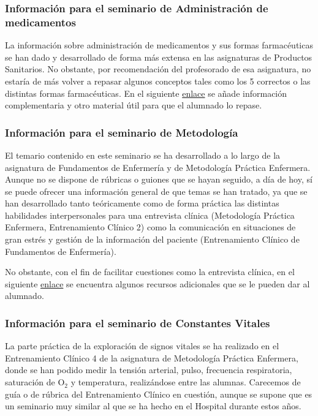 \subsubsection{Información para el seminario de Administración de medicamentos}
La información sobre administración de medicamentos y sus formas farmacéuticas se han dado y desarrollado de forma más extensa en las asignaturas de Productos Sanitarios. No obstante, por recomendación del profesorado de esa asignatura, no estaría de más volver a repasar algunos conceptos tales como los 5 correctos o las distintas formas farmacéuticas. En el siguiente \href{https://drive.google.com/file/d/1HTP2GfZeWYLZwk92cyGrsME6C4fFszZN/view?usp=sharing}{enlace} se añade información complementaria y otro material útil para que el alumnado lo repase.
\subsubsection{Información para el seminario de Metodología}
El temario contenido en este seminario se ha desarrollado a lo largo de la asignatura de Fundamentos de Enfermería y de Metodología Práctica Enfermera. Aunque no se dispone de rúbricas o guiones que se hayan seguido, a día de hoy, sí se puede ofrecer una información general de que temas se han tratado, ya que se han desarrollado tanto teóricamente como de forma práctica las distintas habilidades interpersonales para una entrevista clínica (Metodología Práctica Enfermera, Entrenamiento Clínico 2) como la comunicación en situaciones de gran estrés y gestión de la información del paciente (Entrenamiento Clínico de Fundamentos de Enfermería).

No obstante, con el fin de facilitar cuestiones como la entrevista clínica, en el siguiente \href{https://drive.google.com/file/d/1kEbxhZpLn3UWbtczPN1\_ucrZYSzvwk7P/view?usp=sharing}{enlace} se encuentra algunos recursos adicionales que se le pueden dar al alumnado.
\subsubsection{Información para el seminario de Constantes Vitales}
La parte práctica de la exploración de signos vitales se ha realizado en el Entrenamiento Clínico 4 de la asignatura de Metodología Práctica Enfermera, donde se han podido medir la tensión arterial, pulso, frecuencia respiratoria, saturación de O$_2$ y temperatura, realizándose entre las alumnas. Carecemos de guía o de rúbrica del Entrenamiento Clínico en cuestión, aunque se supone que es un seminario muy similar al que se ha hecho en el Hospital durante estos años.




